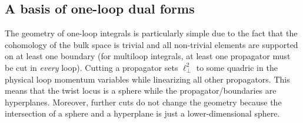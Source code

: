 \documentclass[11pt]{article}
\begin{document}
\subsection{A basis of one-loop dual forms}

The geometry of one-loop integrals is particularly simple due to the fact that the cohomology of the bulk space is trivial and all non-trivial elements are supported on at least one boundary (for multiloop integrals, at least one propagator must be cut in \emph{every} loop). Cutting a propagator sets $\ell_\perp^2$ to some quadric in the physical loop momentum variables while linearizing all other propagators. This means that the twist locus
is a sphere while the propagator/boundaries are hyperplanes. Moreover, further cuts do not change the geometry because the intersection of a sphere and a hyperplane is just a lower-dimensional sphere. 
\end{document}

